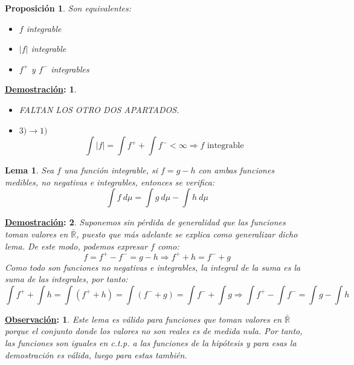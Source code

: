 \documentclass[10pt,a4paper,openright]{book}
\theoremstyle{break}
\newtheorem*{lema}{Lema}
\newtheorem*{prop}{Proposición}
\newtheorem*{demo}{\underline{Demostración}:}
\newtheorem*{obs}{\underline{Observación}:}
\newcommand{\dif}[1]{\ d#1}
\begin{document}
\begin{prop}
Son equivalentes:
\begin{itemize}
\item $f$ integrable
\item $|f|$ integrable
\item $f^+$ y $f^-$ integrables
\end{itemize}
\end{prop}
\begin{demo}
\begin{itemize}
\item FALTAN LOS OTRO DOS APARTADOS.
\item $3)\rightarrow 1)$
$$\int |f| = \int f^+ + \int f^- < \infty \Rightarrow f \mbox{ integrable}$$
\end{itemize}
\end{demo}

\begin{lema}
Sea $f$ una función integrable, si $f = g - h$ con ambas funciones medibles, no negativas e integrables, entonces se verifica:
$$\int f \dif{\mu}= \int g \dif{\mu} - \int h \dif{\mu}$$
\end{lema}
\begin{demo}
Suponemos sin pérdida de generalidad que las funciones toman valores en $\bar{\mathbb{R}}$, puesto que más adelante se explica como generalizar dicho lema. De este modo, podemos expresar $f$ como:
$$f = f^+ - f^- = g-h\Rightarrow f^+ + h = f^- + g$$
Como todo son funciones no negativas e integrables, la integral de la suma es la suma de las integrales, por tanto:
$$\int f^+ + \int h = \int (f^+ + h) = \int (f^- + g)  = \int f^- + \int g \Rightarrow \int f^+ - \int f^- = \int g - \int h$$
\end{demo}

\begin{obs}
Este lema es válido para funciones que toman valores en $\bar{\mathbb{R}}$ porque el conjunto donde los valores no son reales es de medida nula. Por tanto, las funciones son iguales en c.t.p. a las funciones de la hipótesis y para esas la demostración es válida, luego para estas también.
\end{obs}
\end{document}
